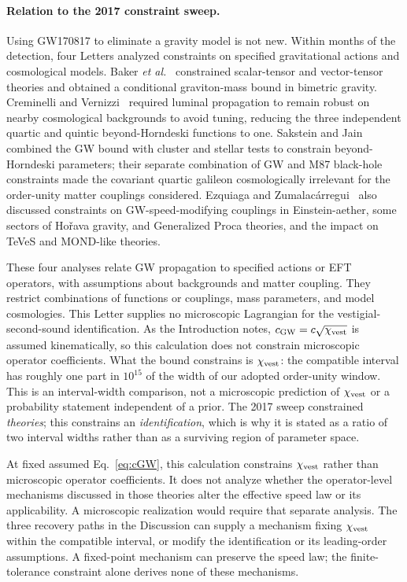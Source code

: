 \documentclass[aps,prl,reprint,nofootinbib,superscriptaddress]{revtex4-2}
\newcommand{\cGW}{c_{\rm GW}}
\newcommand{\chivest}{\chi_{\rm vest}}
\begin{document}
\paragraph{Relation to the 2017 constraint sweep.} Using GW170817 to
eliminate a gravity model is not new. Within months of the detection,
four Letters analyzed constraints on specified gravitational actions
and cosmological models. Baker \emph{et al.}~\cite{BakerBellini2017}
constrained scalar-tensor and vector-tensor theories and obtained a
conditional graviton-mass bound in bimetric gravity. Creminelli and
Vernizzi~\cite{CreminelliVernizzi2017} required luminal propagation
to remain robust on nearby cosmological backgrounds to avoid tuning,
reducing the three independent quartic and quintic beyond-Horndeski
functions to one. Sakstein and Jain~\cite{SaksteinJain2017} combined
the GW bound with cluster and stellar tests to constrain
beyond-Horndeski parameters; their separate combination of GW and M87
black-hole constraints made the covariant quartic galileon
cosmologically irrelevant for the order-unity matter couplings
considered. Ezquiaga and
Zumalac\'arregui~\cite{EzquiagaZumalacarregui2017} also discussed
constraints on GW-speed-modifying couplings in Einstein-aether,
some sectors of Ho\v{r}ava gravity, and Generalized Proca theories,
and the impact on TeVeS and MOND-like theories.

These four analyses relate GW propagation to specified actions or EFT
operators, with assumptions about backgrounds and matter coupling.
They restrict combinations of functions or couplings, mass parameters,
and model cosmologies. This Letter supplies no microscopic Lagrangian for the
vestigial-second-sound identification. As the Introduction notes,
$\cGW = c\sqrt{\chivest}$ is assumed kinematically, so this calculation
does not constrain microscopic operator coefficients.
What the bound constrains is $\chivest$: the compatible interval has
roughly one part in $10^{15}$ of the width of our adopted order-unity
window. This is an interval-width comparison, not a microscopic
prediction of $\chivest$ or a probability statement independent of a prior. The
2017 sweep constrained \emph{theories}; this constrains an
\emph{identification}, which is why it is stated as a ratio of two
interval widths rather than as a surviving region of parameter space.

At fixed assumed Eq.~\eqref{eq:cGW}, this calculation constrains
$\chivest$ rather than microscopic operator coefficients. It does not
analyze whether the operator-level mechanisms discussed in those
theories alter the effective speed law or its applicability. A
microscopic realization would require that separate analysis.
The three recovery paths in
the Discussion can supply a mechanism fixing $\chivest$
within the compatible interval, or modify the identification or its
leading-order assumptions. A fixed-point mechanism can preserve the
speed law; the finite-tolerance constraint alone derives none of
these mechanisms.
\end{document}
